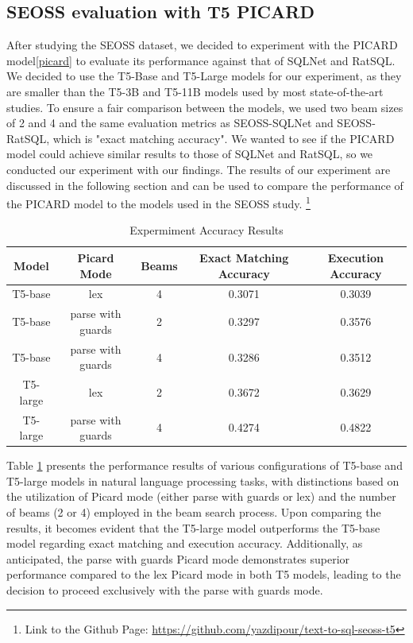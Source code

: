 \subsection{SEOSS evaluation with T5 PICARD}

After studying the SEOSS dataset, we decided to experiment with the PICARD model\ref{picard} to evaluate its performance against that of SQLNet and RatSQL. We decided to use the T5-Base and T5-Large models for our experiment, as they are smaller than the T5-3B and T5-11B models used by most state-of-the-art studies. To ensure a fair comparison between the models, we used two beam sizes of 2 and 4 and the same evaluation metrics as SEOSS-SQLNet and SEOSS-RatSQL, which is "exact matching accuracy". We wanted to see if the PICARD model could achieve similar results to those of SQLNet and RatSQL, so we conducted our experiment with our findings. The results of our experiment are discussed in the following section and can be used to compare the performance of the PICARD model to the models used in the SEOSS study.
\footnote[1]{Link to the Github Page: \url{https://github.com/yazdipour/text-to-sql-seoss-t5}}

\begin{table}[!ht]
    \centering
    \begin{tabular}{ccccc}
        \hline
        Model    & Picard Mode       & Beams & \textbf{Exact Matching Accuracy} & \textbf{Execution Accuracy} \\ \hline
        T5-base  & lex               & 4     & 0.3071                           & 0.3039                      \\ \hline
        T5-base  & parse with guards & 2     & 0.3297                           & 0.3576                      \\ \hline
        T5-base  & parse with guards & 4     & 0.3286                           & 0.3512                      \\ \hline
        T5-large & lex               & 2     & 0.3672                           & 0.3629                      \\ \hline
        T5-large & parse with guards & 4     & 0.4274                           & 0.4822                      \\ \hline
    \end{tabular}
    \caption{Expermiment Accuracy Results}
    \label{tab:exp-acc-t5}
\end{table}

Table \ref{tab:exp-acc-t5} presents the performance results of various configurations of T5-base and T5-large models in natural language processing tasks, with distinctions based on the utilization of Picard mode (either parse with guards or lex) and the number of beams (2 or 4) employed in the beam search process. Upon comparing the results, it becomes evident that the T5-large model outperforms the T5-base model regarding exact matching and execution accuracy. Additionally, as anticipated, the parse with guards Picard mode demonstrates superior performance compared to the lex Picard mode in both T5 models, leading to the decision to proceed exclusively with the parse with guards mode.

